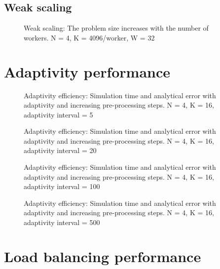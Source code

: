 \subsection{Weak scaling} \label{section:results:scaling_tests:weak}


\begin{figure}[H]
	\centering
	
	\caption{Weak scaling: The problem size increases with the number of workers. N = 4, K = 4096/worker, W = 32}
	\label{fig:weak_scaling}
\end{figure}

\section{Adaptivity performance} \label{section:results:adaptivity_performance}

\begin{figure}[H]
	\centering
	
	\caption{Adaptivity efficiency: Simulation time and analytical error with adaptivity and increasing pre-processing steps. N = 4, K = 16, adaptivity interval = 5}
	\label{fig:adaptivity_efficiency_C5}
\end{figure}

\begin{figure}[H]
	\centering
	
	\caption{Adaptivity efficiency: Simulation time and analytical error with adaptivity and increasing pre-processing steps. N = 4, K = 16, adaptivity interval = 20}
	\label{fig:adaptivity_efficiency_C20}
\end{figure}

\begin{figure}[H]
	\centering
	
	\caption{Adaptivity efficiency: Simulation time and analytical error with adaptivity and increasing pre-processing steps. N = 4, K = 16, adaptivity interval = 100}
	\label{fig:adaptivity_efficiency_C100}
\end{figure}

\begin{figure}[H]
	\centering
	
	\caption{Adaptivity efficiency: Simulation time and analytical error with adaptivity and increasing pre-processing steps. N = 4, K = 16, adaptivity interval = 500}
	\label{fig:adaptivity_efficiency_C500}
\end{figure}

\section{Load balancing performance} \label{section:results:load_balancing_performance}
